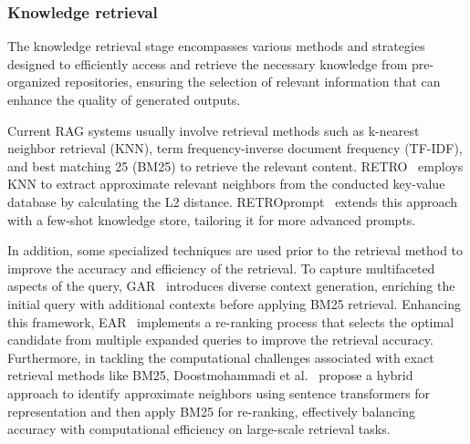 \documentclass[lettersize,journal]{IEEEtran}
\begin{document}
\subsubsection{Knowledge retrieval}
The knowledge retrieval stage encompasses various methods and strategies designed to efficiently access and retrieve the necessary knowledge from pre-organized repositories, ensuring the selection of relevant information that can enhance the quality of generated outputs.

Current RAG systems usually involve retrieval methods such as k-nearest neighbor retrieval (KNN), term frequency-inverse document frequency (TF-IDF), and best matching 25 (BM25) to retrieve the relevant content.
RETRO~\cite{borgeaud2022improving} employs KNN to extract approximate relevant neighbors from the conducted key-value database by calculating the L2 distance. RETROprompt~\cite{chen2022decoupling} extends this approach with a few-shot knowledge store, tailoring it for more advanced prompts.

In addition, some specialized techniques are used prior to the retrieval method to improve the accuracy and efficiency of the retrieval. To capture multifaceted aspects of the query, GAR~\cite{mao2020generation} introduces diverse context generation, enriching the initial query with additional contexts before applying BM25 retrieval. Enhancing this framework, EAR~\cite{chuang2023expand} implements a re-ranking process that selects the optimal candidate from multiple expanded queries to improve the retrieval accuracy. Furthermore, in tackling the computational challenges associated with exact retrieval methods like BM25, Doostmohammadi et al.~\cite{doostmohammadi2023surface} propose a hybrid approach to identify approximate neighbors using sentence transformers for representation and then apply BM25 for re-ranking, effectively balancing accuracy with computational efficiency on large-scale retrieval tasks.

\end{document}
